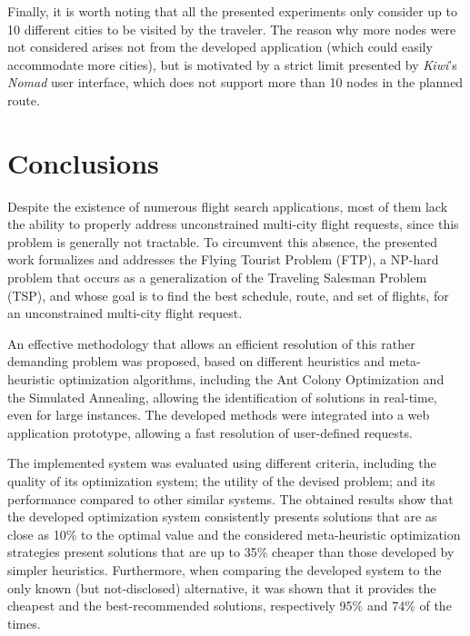 \documentclass[onecolumn]{elsarticle}
\begin{document}
Finally, it is worth noting that all the presented experiments only consider up to 10 different cities to be visited by the traveler. The reason why more nodes were not considered arises not from the developed application (which could easily accommodate more cities), but is motivated by a strict limit presented by \textit{Kiwi}'s \textit{Nomad} user interface, which does not support more than 10 nodes in the planned route.

\section{Conclusions}
\label{sec:conclusions}
Despite the existence of numerous flight search applications, most of them lack the ability to properly address unconstrained multi-city flight requests, since this problem is generally not tractable. To circumvent this absence, the presented work formalizes and addresses the Flying Tourist Problem (FTP), a NP-hard problem that occurs as a generalization of the Traveling Salesman Problem (TSP), and whose goal is to find the best schedule, route, and set of flights, for an unconstrained multi-city flight request.

An effective methodology that allows an efficient resolution of this rather demanding problem was proposed, based on different heuristics and meta-heuristic optimization algorithms, including the Ant Colony Optimization and the Simulated Annealing, allowing the identification of solutions in real-time, even for large instances. The developed methods were integrated into a web application prototype, allowing a fast resolution of user-defined requests. 

The implemented system was evaluated using different criteria, including the quality of its optimization system; the utility of the devised problem; and its performance compared to other similar systems. The obtained results show that the developed optimization system consistently presents solutions that are as close as 10\% to the optimal value and the considered meta-heuristic optimization strategies present solutions that are up to 35\% cheaper than those developed by simpler heuristics. Furthermore, when comparing the developed system to the only known (but not-disclosed) alternative, it was shown that it provides the cheapest and the best-recommended solutions, respectively 95\% and 74\% of the times. 
\end{document}
